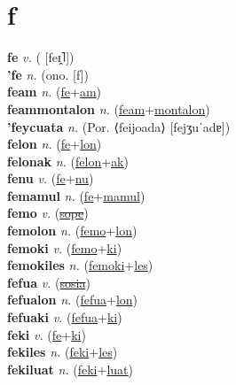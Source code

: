 \section{f}

\textbf{fe} \textit{v.} ( [feɪ̯˥])
 \label{fe} \\
\textbf{'fe} \textit{n.} (ono. [f])
 \label{'fe} \\
\textbf{feam} \textit{n.} (\hyperref[fe]{fe}+\hyperref[am]{am})
 \label{feam} \\
\textbf{feammontalon} \textit{n.} (\hyperref[feam]{feam}+\hyperref[montalon]{montalon})
 \label{feammontalon} \\
\textbf{'feycuata} \textit{n.} (Por. ⟨feijoada⟩ [fejʒuˈadɐ])
 \label{'feycuata} \\
\textbf{felon} \textit{n.} (\hyperref[fe]{fe}+\hyperref[lon]{lon})
 \label{felon} \\
\textbf{felonak} \textit{n.} (\hyperref[felon]{felon}+\hyperref[ak]{ak})
 \label{felonak} \\
\textbf{fenu} \textit{v.} (\hyperref[fe]{fe}+\hyperref[nu]{nu})
 \label{fenu} \\
\textbf{femamul} \textit{n.} (\hyperref[fe]{fe}+\hyperref[mamul]{mamul})
 \label{femamul} \\
\textbf{femo} \textit{v.} (\hyperref[sope]{\sout{sope}})
 \label{femo} \\
\textbf{femolon} \textit{n.} (\hyperref[femo]{femo}+\hyperref[lon]{lon})
 \label{femolon} \\
\textbf{femoki} \textit{v.} (\hyperref[femo]{femo}+\hyperref[ki]{ki})
 \label{femoki} \\
\textbf{femokiles} \textit{n.} (\hyperref[femoki]{femoki}+\hyperref[les]{les})
 \label{femokiles} \\
\textbf{fefua} \textit{v.} (\hyperref[sosia]{\sout{sosia}})
 \label{fefua} \\
\textbf{fefualon} \textit{n.} (\hyperref[fefua]{fefua}+\hyperref[lon]{lon})
 \label{fefualon} \\
\textbf{fefuaki} \textit{v.} (\hyperref[fefua]{fefua}+\hyperref[ki]{ki})
 \label{fefuaki} \\
\textbf{feki} \textit{v.} (\hyperref[fe]{fe}+\hyperref[ki]{ki})
 \label{feki} \\
\textbf{fekiles} \textit{n.} (\hyperref[feki]{feki}+\hyperref[les]{les})
 \label{fekiles} \\
\textbf{fekiluat} \textit{n.} (\hyperref[feki]{feki}+\hyperref[luat]{luat})
 \label{fekiluat} \\
